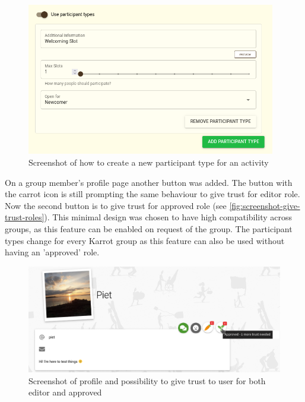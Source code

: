 \documentclass[
	a4paper,%
	11pt,%
	]{article}
\begin{document}
\begin{figure}[!h]
	\includegraphics[width=0.97\textwidth,
	]{images/screenshot_pick-ups_participant-type.png}
	\caption{Screenshot of how to create a new participant type for an activity}
	\label{fig:screenshot-create-role}
\end{figure}

On a group member's profile page another button was added. The button with the carrot icon is still prompting the same behaviour to give trust for editor role. Now the second button is to give trust for approved role (see \autoref{fig:screenshot-give-trust-roles}). This minimal design was chosen to have high compatibility across groups, as this feature can be enabled on request of the group. The participant types change for every Karrot group as this feature can also be used without having an 'approved' role.


\begin{figure}[!ht]
	\includegraphics[width=\textwidth,
	]{images/screenshot_giving-trust-profile_approved.png}
	\caption{Screenshot of profile and possibility to give trust to user for both editor and approved}
	\label{fig:screenshot-give-trust-roles}
\end{figure}
\end{document}
